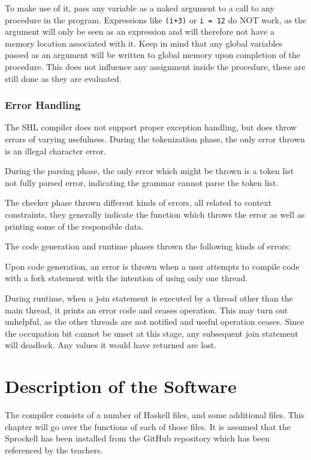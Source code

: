 \documentclass[twoside]{report}
\begin{document}
To make use of it, pass any variable as a naked argument to a call to any procedure in the program. Expressions like \texttt{(i+3)} or \texttt{i = 12} do NOT work, as the argument will only be seen as an expression and will therefore not have a memory location associated with it. Keep in mind that any global variables passed as an argument will be written to global memory upon completion of the procedure. This does not influence any assignment inside the procedure, these are still done as they are evaluated.


\subsection{Error Handling}
\label{def:error_handling}
The SHL compiler does not support proper exception handling, but does throw errors of varying usefulness. During the tokenization phase, the only error thrown is an illegal character error.

During the parsing phase, the only error which might be thrown is a token list not fully parsed error, indicating the grammar cannot parse the token list.

The checker phase thrown different kinds of errors, all related to context constraints, they generally indicate the function which throws the error as well as printing some of the responsible data.

The code generation and runtime phases thrown the following kinds of errors:

Upon code generation, an error is thrown when a user attempts to compile code with a fork statement with the intention of using only one thread.

During runtime, when a join statement is executed by a thread other than the main thread, it prints an error code and ceases operation. This may turn out unhelpful, as the other threads are not notified and useful operation ceases. Since the occupation bit cannot be unset at this stage, any subsequent join statement will deadlock. Any values it would have returned are lost.

\chapter{Description of the Software}
\label{description_of_the_software}
The compiler consists of a number of Haskell files, and some additional files. This chapter will go over the functions of each of those files. It is assumed that the Sprockell has been installed from the GitHub repository which has been referenced by the teachers.
\end{document}
